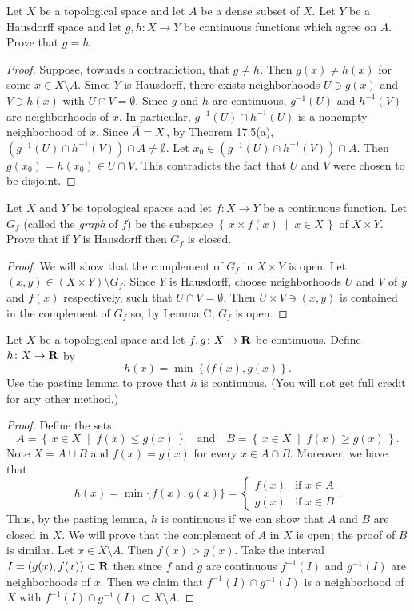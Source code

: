 \begin{problem}
Let $X$ be a topological space and let $A$ be a dense subset of
$X$. Let $Y$ be a Hausdorff space and let $g,h\colon X\to Y$ be
continuous functions which agree on $A$. Prove that $g=h$.
\end{problem}
\begin{proof}
Suppose, towards a contradiction, that $g\neq h$. Then $g(x)\neq
h(x)$ for some $x\in X\setminus A$. Since $Y$ is Hausdorff, there
exists neighborhoods $U\ni g(x)$ and $V\ni h(x)$ with $U\cap
V=\emptyset$. Since $g$ and $h$ are continuous, $g^{-1}(U)$ and
$h^{-1}(V)$ are neighborhoods of $x$. In particular,
$g^{-1}(U)\cap h^{-1}(U)$ is a nonempty neighborhood of
$x$. Since $\overline{A}=X$, by Theorem 17.5(a), $\left(g^{-1}(U)\cap
h^{-1}(V)\right)\cap A\neq\emptyset$. Let $x_0\in\left(g^{-1}(U)\cap
h^{-1}(V)\right)\cap A$. Then $g(x_0)=h(x_0)\in U\cap V$. This
contradicts the fact that $U$ and $V$ were chosen to be
disjoint.
\end{proof}
\begin{problem}
Let $X$ and $Y$ be topological spaces and let $f\colon X\to Y$
be a continuous function. Let $G_f$ (called the \emph{graph} of
$f$) be the subspace $\left\{\,x\times f(x)\;\middle|\;x\in
  X\,\right\}$ of $X\times Y$. Prove that if $Y$ is Hausdorff then
$G_f$ is closed.
\end{problem}
\begin{proof}
We will show that the complement of $G_f$ in $X\times Y$ is
open. Let $(x,y)\in(X\times Y)\setminus G_f$. Since $Y$ is
Hausdorff, choose neighborhoods $U$ and $V$ of $y$ and $f(x)$
respectively, such that $U\cap V=\emptyset$. Then $U\times
V\ni(x,y)$ is contained in the complement of $G_f$ so, by Lemma
C, $G_f$ is open.
\end{proof}
\begin{problem}
Let $X$ be a topological space and let $f,g\colon X\to\mathbf{R}$ be
continuous. Define $h\colon X\to\mathbf{R}$ by
\[
h(x)=\min\left\{(f(x),g(x)\right\}.
\]
Use the pasting lemma to prove that $h$ is continuous. (You will
not get full credit for any other method.)
\end{problem}
\begin{proof}
Define the sets
\[
A=\left\{\,x\in X\;\middle|\;f(x)\leq g(x)\,\right\}
\quad\text{and}\quad
B=\left\{\,x\in X\;\middle|\;f(x)\geq g(x)\,\right\}.
\]
Note $X=A\cup B$ and $f(x)=g(x)$ for every $x\in A\cap
B$. Moreover, we have that
\[
h(x)
=\min\{f(x),g(x)\}
=\begin{cases}
f(x)&\text{if $x\in A$}\\
g(x)&\text{if $x\in B$}
\end{cases}.
\]
Thus, by the pasting lemma, $h$ is continuous if we can show that
$A$ and $B$ are closed in $X$. We will prove that the complement
of $A$ in $X$ is open; the proof of $B$ is similar. Let $x\in
X\setminus A$. Then $f(x)>g(x)$. Take the interval
$I=(g(x),f(x))\subset\mathbf{R}$ then since $f$ and $g$ are continuous
$f^{-1}(I)$ and $g^{-1}(I)$ are neighborhoods of
$x$. Then we claim that $f^{-1}(I)\cap g^{-1}(I)$ is a
neighborhood of $X$ with $f^{-1}(I)\cap g^{-1}(I)\subset
X\setminus A$.
\end{proof}
